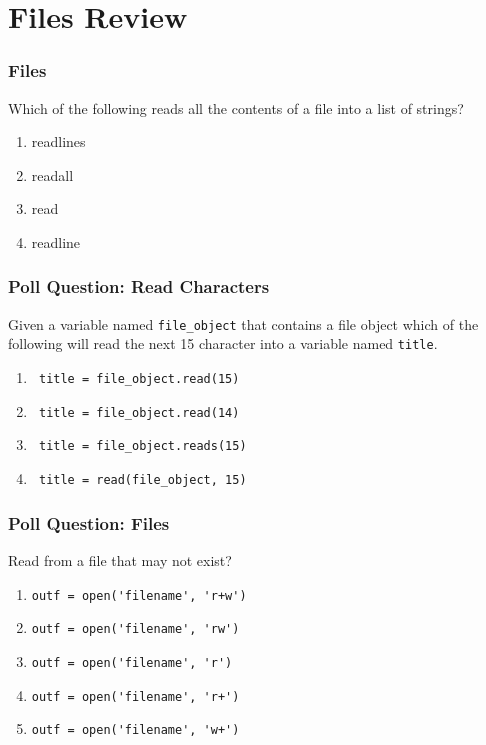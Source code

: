 \documentclass{beamer}
\begin{document}
\section{Files Review}
%
%
\begin{frame}[fragile]
  \frametitle{Files}
  Which of the following reads all the contents of a file into a list of strings?
  \vfill
  \begin{enumerate}[A]
    \item readlines
    \item readall
    \item read
    \item readline
  \end{enumerate}
\end{frame}

%
%
\begin{frame}[fragile]
  \frametitle{Poll Question: Read Characters}
  Given a variable named \lstinline|file_object| that contains a file object which of the following will read the next 15 character into a variable named \lstinline|title|.
  \vfill
  \begin{enumerate}[A]
    \item \lstinline| title = file_object.read(15)|
    \item \lstinline| title = file_object.read(14)|
    \item \lstinline| title = file_object.reads(15)|
    \item \lstinline| title = read(file_object, 15)|
  \end{enumerate}
\end{frame}

%
%
\begin{frame}[fragile]
  \frametitle{Poll Question: Files}
  Read from a file that may not exist?
  \vfill
  \begin{enumerate}[A]
    \item \lstinline|outf = open('filename', 'r+w')|
    \item \lstinline|outf = open('filename', 'rw')|
    \item \lstinline|outf = open('filename', 'r')|
    \item \lstinline|outf = open('filename', 'r+')|
    \item \lstinline|outf = open('filename', 'w+')|
  \end{enumerate}
\end{frame}
\end{document}
